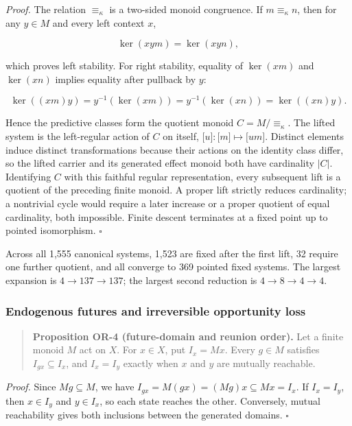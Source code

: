 \documentclass[11pt,a4paper]{article}
\begin{document}
\emph{Proof.} The relation \(\equiv_{\kappa}\) is a two-sided monoid
congruence. If \(m \equiv_{\kappa}n\), then for any \(y \in M\) and
every left context \(x\),

\[\ker(xym) = \ker(xyn),\]

which proves left stability. For right stability, equality of
\(\ker(xm)\) and \(\ker(xn)\) implies equality after pullback by \(y\):

\[\ker\left( (xm)y \right) = y^{- 1}\left( \ker(xm) \right) = y^{- 1}\left( \ker(xn) \right) = \ker\left( (xn)y \right).\]

Hence the predictive classes form the quotient monoid
\(C = M/ \equiv_{\kappa}\). The lifted system is the left-regular action
of \(C\) on itself,
\(\lbrack u\rbrack:\lbrack m\rbrack \mapsto \lbrack um\rbrack\).
Distinct elements induce distinct transformations because their actions
on the identity class differ, so the lifted carrier and its generated
effect monoid both have cardinality \(|C|\). Identifying \(C\) with this
faithful regular representation, every subsequent lift is a quotient of
the preceding finite monoid. A proper lift strictly reduces cardinality;
a nontrivial cycle would require a later increase or a proper quotient
of equal cardinality, both impossible. Finite descent terminates at a
fixed point up to pointed isomorphism. \(\ensuremath{\square}\)

Across all 1,555 canonical systems, 1,523 are fixed after the first
lift, 32 require one further quotient, and all converge to 369 pointed
fixed systems. The largest expansion is
\(4 \rightarrow 137 \rightarrow 137\); the largest second reduction is
\(4 \rightarrow 8 \rightarrow 4 \rightarrow 4\).

\subsubsection{Endogenous futures and irreversible opportunity
loss}

\begin{quote}
\textbf{Proposition OR-4 (future-domain and reunion order).} Let a
finite monoid \(M\) act on \(X\). For \(x \in X\), put \(I_{x} = Mx\).
Every \(g \in M\) satisfies \(I_{gx} \subseteq I_{x}\), and
\(I_{x} = I_{y}\) exactly when \(x\) and \(y\) are mutually reachable.
\end{quote}

\emph{Proof.} Since \(Mg \subseteq M\), we have
\(I_{gx} = M(gx) = (Mg)x \subseteq Mx = I_{x}\). If \(I_{x} = I_{y}\),
then \(x \in I_{y}\) and \(y \in I_{x}\), so each state reaches the
other. Conversely, mutual reachability gives both inclusions between the
generated domains. \(\ensuremath{\square}\)
\end{document}
